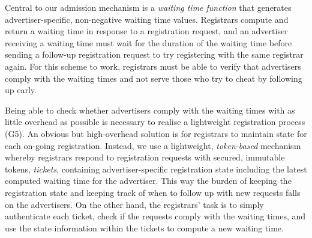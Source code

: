 
Central to our admission mechanism is a \textit{waiting time function} that generates advertiser-specific, non-negative waiting time values. Registrars compute and return a waiting time in response to a registration request, and an advertiser receiving a waiting time must wait for the duration of the waiting time before sending a follow-up registration request to try registering with the same registrar again. For this scheme to work, registrars must be able to verify that advertisers comply with the waiting times and not serve those who try to cheat by following up early. 

Being able to check whether advertisers comply with the waiting times with as little overhead as possible is necessary to realise a lightweight registration process (G5).  
An obvious but high-overhead solution is for registrars to maintain state for each on-going registration. %
Instead, we use a lightweight, \textit{token-based} mechanism whereby registrars respond to registration requests with secured, immutable tokens, \ie \textit{tickets}, containing advertiser-specific registration state including the latest computed waiting time for the advertiser. This way the burden of keeping the registration state and keeping track of when to follow up with new requests falls on the advertisers. On the other hand, the registrars' task is to simply authenticate each ticket, check if the requests comply with the waiting times, and use the state information within the tickets to compute a new waiting time.  


